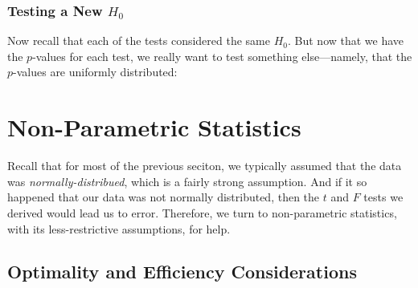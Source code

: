 \documentclass[a4paper,12pt]{scrartcl}
\begin{document}
\subsubsection{Testing a New $H_0$}

Now recall that each of the tests considered the same $H_0$. But
now that we have the $p$-values for each test, we really want
to test something else---namely, that the $p$-values are uniformly
distributed:



\newpage
\section{Non-Parametric Statistics}

Recall that for most of the previous seciton, we typically assumed
that the data was \emph{normally-distribued}, which is a fairly strong
assumption.  And if it so happened that our data was not normally
distributed, then the $t$ and $F$ tests we derived would lead us
to error.  Therefore, we turn to non-parametric statistics, with its
less-restrictive assumptions, for help.

\subsection{Optimality and Efficiency Considerations}
\end{document}
